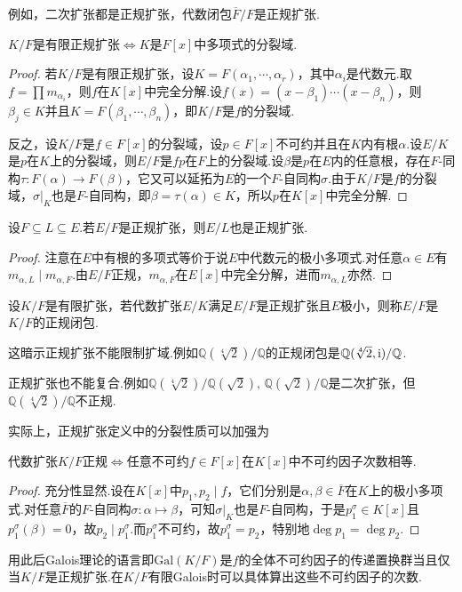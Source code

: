 例如，二次扩张都是正规扩张，代数闭包$\overline{F}/F$是正规扩张.
\begin{prop}
    $K/F$是有限正规扩张$\iff K$是$F[x]$中多项式的分裂域.
\end{prop}
\begin{proof}
    若$K/F$是有限正规扩张，设$K=F(\alpha_1,\cdots,\alpha_r)$，其中$\alpha_i$是代数元.取$f=\prod m_{\alpha_i}$，则$f$在$K[x]$中完全分解.设$f(x)=(x-\beta_1)\cdots(x-\beta_n)$，则$\beta_j\in K$并且$K=F(\beta_1,\cdots,\beta_n)$，即$K/F$是$f$的分裂域.

    反之，设$K/F$是$f\in F[x]$的分裂域，设$p\in F[x]$不可约并且在$K$内有根$\alpha$.设$E/K$是$p$在$K$上的分裂域，则$E/F$是$fp$在$F$上的分裂域.设$\beta$是$p$在$E$内的任意根，存在$F$-同构$\tau\colon F(\alpha)\to F(\beta)$，它又可以延拓为$E$的一个$F$-自同构$\sigma$.由于$K/F$是$f$的分裂域，$\sigma|_K$也是$F$-自同构，即$\beta=\tau(\alpha)\in K$，所以$p$在$K[x]$中完全分解.
\end{proof}
\begin{prop}
    设$F\subseteq L\subseteq E$.若$E/F$是正规扩张，则$E/L$也是正规扩张.
\end{prop}
\begin{proof}
    注意在$E$中有根的多项式等价于说$E$中代数元的极小多项式.对任意$\alpha\in E$有$m_{\alpha,L}\mid m_{\alpha,F}$.由$E/F$正规，$m_{\alpha,F}$在$E[x]$中完全分解，进而$m_{\alpha,L}$亦然.
\end{proof}

设$K/F$是有限扩张，若代数扩张$E/K$满足$E/F$是正规扩张且$E$极小，则称$E/F$是$K/F$的{\heiti 正规闭包}.
\begin{remark}
    这暗示正规扩张不能限制扩域.例如$\mathbb{Q}(\sqrt[4]{2})/\mathbb{Q}$的正规闭包是$\mathbb{Q}(\sqrt[4]{2},\mathrm{i})/\mathbb{Q}$.

    正规扩张也不能复合.例如$\mathbb{Q}(\sqrt[4]{2})/\mathbb{Q}(\sqrt2),\,\mathbb{Q}(\sqrt2)/\mathbb{Q}$是二次扩张，但$\mathbb{Q}(\sqrt[4]{2})/\mathbb{Q}$不正规.
\end{remark}

实际上，正规扩张定义中的分裂性质可以加强为
\begin{prop}
    代数扩张$K/F$正规$\iff$任意不可约$f\in F[x]$在$K[x]$中不可约因子次数相等.
\end{prop}
\begin{proof}
    充分性显然.设在$K[x]$中$p_1,p_2\mid f$，它们分别是$\alpha,\beta\in\overline{F}$在$K$上的极小多项式.对任意$\overline{F}$的$F$-自同构$\sigma\colon\alpha\mapsto\beta$，可知$\sigma|_K$也是$F$-自同构，于是$p_1^\sigma\in K[x]$且$p_1^\sigma(\beta)=0$，故$p_2\mid p_1^\sigma$.而$p_1^\sigma$不可约，故$p_1^\sigma=p_2$，特别地$\deg p_1=\deg p_2$.
\end{proof}
\begin{remark}
    用此后Galois理论的语言即$\mathrm{Gal}(K/F)$是$f$的全体不可约因子的传递置换群当且仅当$K/F$是正规扩张.在$K/F$有限Galois时可以具体算出这些不可约因子的次数.
\end{remark}

